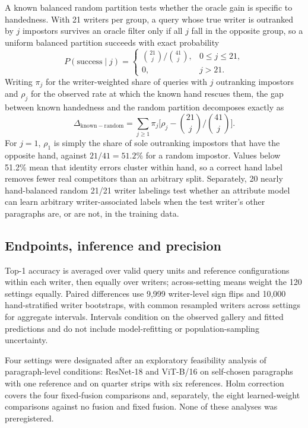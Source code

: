 A known balanced random partition tests whether the oracle gain is specific to handedness. With 21 writers per group, a query whose true writer is outranked by $j$ impostors survives an oracle filter only if all $j$ fall in the opposite group, so a uniform balanced partition succeeds with exact probability
\begin{equation}
P(\mathrm{success}\mid j)=\begin{cases}\binom{21}{j}/\binom{41}{j},&0\leq j\leq21,\\0,&j>21.\end{cases}
\label{eq:randompartition}
\end{equation}
Writing $\pi_j$ for the writer-weighted share of queries with $j$ outranking impostors and $\rho_j$ for the observed rate at which the known hand rescues them, the gap between known handedness and the random partition decomposes exactly as
\begin{equation}
\Delta_{\mathrm{known}-\mathrm{random}}=\sum_{j\geq1}\pi_j\Big[\rho_j-\binom{21}{j}\big/\binom{41}{j}\Big].
\label{eq:decomposition}
\end{equation}
For $j=1$, $\rho_1$ is simply the share of sole outranking impostors that have the opposite hand, against $21/41=51.2\%$ for a random impostor. Values below 51.2\% mean that identity errors cluster within hand, so a correct hand label removes fewer real competitors than an arbitrary split. Separately, 20 nearly hand-balanced random 21/21 writer labelings test whether an attribute model can learn arbitrary writer-associated labels when the test writer's other paragraphs are, or are not, in the training data.

\subsection{Endpoints, inference and precision}
\label{sec:statistics}
Top-1 accuracy is averaged over valid query units and reference configurations within each writer, then equally over writers; across-setting means weight the 120 settings equally. Paired differences use 9,999 writer-level sign flips and 10,000 hand-stratified writer bootstraps, with common resampled writers across settings for aggregate intervals. Intervals condition on the observed gallery and fitted predictions and do not include model-refitting or population-sampling uncertainty.

Four settings were designated after an exploratory feasibility analysis of paragraph-level conditions: ResNet-18 and ViT-B/16 on self-chosen paragraphs with one reference and on quarter strips with six references. Holm correction \cite{holm1979simple} covers the four fixed-fusion comparisons and, separately, the eight learned-weight comparisons against no fusion and fixed fusion. None of these analyses was preregistered.

